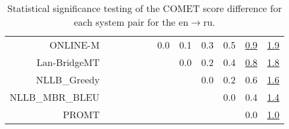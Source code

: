 \documentclass[11pt]{article}
\begin{document}
\begin{sidewaystable}
\begin{center}
{\begin{tabular}{rccccccccccc}
ONLINE-M &    &  &  &  &  & \cellcolor{red!0} 0.0 & \cellcolor{red!0} 0.1 & \cellcolor{red!0} 0.3 & \cellcolor{red!50} 0.5 & \cellcolor{red!70} \underline{0.9} & \cellcolor{red!70} \underline{1.9}\\ 
Lan-BridgeMT &    &  &  &  &  &  & \cellcolor{red!0} 0.0 & \cellcolor{red!0} 0.2 & \cellcolor{red!30} 0.4 & \cellcolor{red!70} \underline{0.8} & \cellcolor{red!70} \underline{1.8}\\ 
NLLB\_Greedy &    &  &  &  &  &  &  & \cellcolor{red!0} 0.0 & \cellcolor{red!0} 0.2 & \cellcolor{red!70} 0.6 & \cellcolor{red!70} \underline{1.6}\\ 
NLLB\_MBR\_BLEU &    &  &  &  &  &  &  &  & \cellcolor{red!0} 0.0 & \cellcolor{red!50} 0.4 & \cellcolor{red!70} \underline{1.4}\\ 
PROMT &  &  &    &  &  &  &  &  &  & \cellcolor{red!0} 0.0 & \cellcolor{red!70} \underline{1.0}\\ 
\bottomrule 
\end{tabular} }
\caption{Statistical significance testing of the COMET score difference for each system pair for the en$\rightarrow$ru.} 
 \end{center} \end{sidewaystable} 
\end{document}
